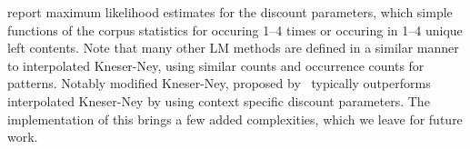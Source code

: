  report maximum likelihood estimates for the discount parameters, which simple functions of the corpus statistics for \ngrams occuring 1--4 times or occuring in 1--4 unique left contents. 
Note that many other LM methods are defined in a similar manner to interpolated Kneser-Ney, using similar counts and occurrence counts for \ngram patterns.
Notably modified Kneser-Ney, proposed by~ typically outperforms interpolated Kneser-Ney by using context specific discount parameters.
The implementation of this brings a few added complexities, which we leave for future work.


